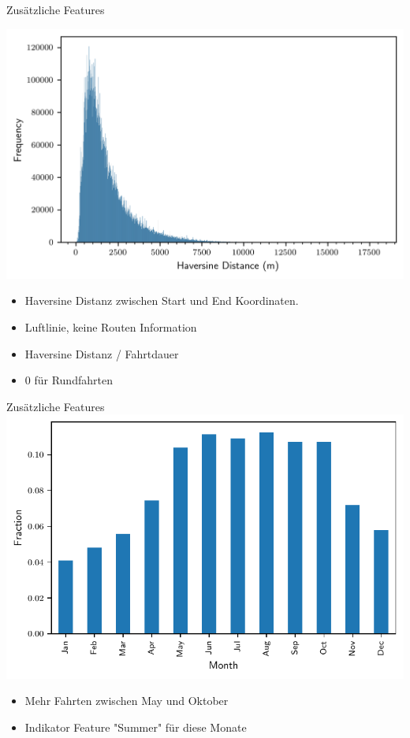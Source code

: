 \begin{frame}{Zusätzliche Features}

\centering
\includegraphics[height=0.6\textheight]{../Images/Distance.png}

{
{
\begin{itemize}
\item Haversine Distanz zwischen Start und End Koordinaten.
\item Luftlinie, keine Routen Information
\end{itemize}
}
}

{
{
\begin{itemize}
\item Haversine Distanz / Fahrtdauer
\item 0 für Rundfahrten
\end{itemize}
}
}
\end{frame}

\begin{frame}{Zusätzliche Features}
\centering
\includegraphics[height=0.6\textheight]{../Images/CountByMonth}

{
\begin{itemize}
\item Mehr Fahrten zwischen May und Oktober
\item Indikator Feature "Summer" für diese Monate
\end{itemize}
}
\end{frame}


